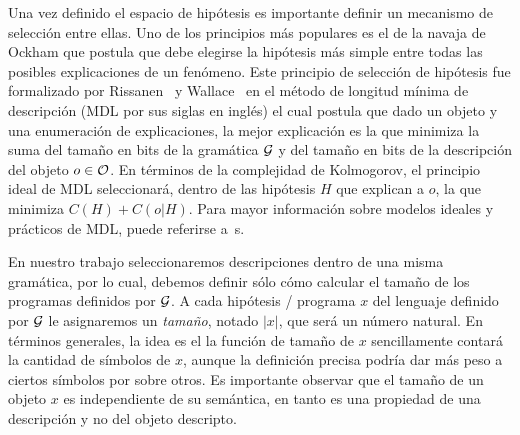 Una vez definido el espacio de hipótesis es importante definir un mecanismo de selección entre ellas. Uno de los principios más populares es el de la navaja de Ockham que postula que debe elegirse la hipótesis más simple entre todas las posibles explicaciones de un fenómeno. Este principio de selección de hipótesis fue formalizado por Rissanen~\cite{rissanen1978modeling} y Wallace~\cite{wallace1968information} en el método de longitud mínima de descripción (MDL por sus siglas en inglés) el cual postula que dado un objeto y una enumeración de explicaciones, la mejor explicación es la que minimiza la suma del tamaño en bits de la gramática $\gram$ y del tamaño en bits de la descripción del objeto $o \in \+O$. En términos de la complejidad de Kolmogorov, el principio ideal de MDL seleccionará, dentro de las hipótesis $H$ que explican a $o$, la que minimiza $C(H) + C(o|H)$. Para mayor información sobre modelos ideales y prácticos de MDL, puede referirse a~s\cite{grunwald2007minimum,li2013introduction}.

En nuestro trabajo seleccionaremos descripciones dentro de una misma gramática, por lo cual, debemos definir sólo cómo calcular el tamaño de los programas definidos por $\gram$. A cada hipótesis / programa $x$ del lenguaje definido por $\gram$ le asignaremos un {\em tamaño}, notado $|x|$, que será un número natural. En términos generales, la idea es el la función de tamaño de $x$ sencillamente contará la cantidad de símbolos de $x$, aunque la definición precisa podría dar más peso a ciertos símbolos por sobre otros. Es importante observar que el tamaño de un objeto $x$ es independiente de su semántica, en tanto es una propiedad de una descripción y no del objeto descripto.

